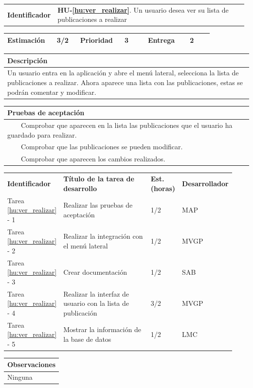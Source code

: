 \documentclass[11pt]{article}
\newcommand{\tabitem}{~~\llap{\textbullet}~~}
\begin{document}
\begin{longtable}{p{0.18\linewidth}|p{0.8\linewidth}}
  \rowcolor{LightCyan}
  \textbf{Identificador} & \textbf{HU-\ref{hu:ver_realizar}}. Un usuario desea ver su lista de publicaciones a realizar \\  
\end{longtable}
\vspace{-0.8cm}
\begin{longtable}{p{0.18\linewidth}|p{0.1\linewidth}|p{0.18\linewidth}|p{0.1\linewidth}|p{0.18\linewidth}|p{0.1\linewidth}}
  \toprule
  \textbf{Estimación} & 3/2 & \textbf{Prioridad} & 3 & \textbf{Entrega} & 2 \\
  \bottomrule
\end{longtable}
\vspace{-0.8cm}
\begin{longtable}{p{1.028\linewidth}}
  \textbf{Descripción}\\
  \midrule
  Un usuario entra en la aplicación y abre el menú lateral, selecciona la lista de publicaciones a realizar. Ahora aparece una lista con las publicaciones, estas se podrán comentar y modificar. \\
  \bottomrule
\end{longtable}
\vspace{-0.8cm}
\begin{longtable}{p{1.028\linewidth}}
  \textbf{Pruebas de aceptación}\\
  \midrule
  \tabitem Comprobar que aparecen en la lista las publicaciones que el usuario ha guardado para realizar. \\
  \tabitem Comprobar que las publicaciones se pueden modificar. \\
  \tabitem Comprobar que aparecen los cambios realizados.\\
\end{longtable}
\vspace{-0.8cm}
\begin{longtable}{p{0.18\linewidth}|p{0.48\linewidth}|p{0.1\linewidth}|p{0.17\linewidth}}
  \toprule
  \textbf{Identificador} & \textbf{Título de la tarea de desarrollo} & \textbf{Est. (horas)} & \textbf{Desarrollador} \\
  Tarea \ref{hu:ver_realizar} - 1 & Realizar las pruebas de aceptación & 1/2 & MAP\\
  Tarea \ref{hu:ver_realizar} - 2 & Realizar la integración con el menú lateral & 1/2 & MVGP\\
  Tarea \ref{hu:ver_realizar} - 3 & Crear documentación & 1/2 & SAB\\
  Tarea \ref{hu:ver_realizar} - 4 & Realizar la interfaz de usuario con la lista de publicación & 3/2 &  MVGP\\
  Tarea \ref{hu:ver_realizar} - 5 & Mostrar la información de la base de datos & 1/2 &  LMC\\
  \bottomrule
\end{longtable}
\vspace{-0.8cm}
\begin{longtable}{p{1.028\linewidth}}
  \textbf{Observaciones}\\
  \midrule
  Ninguna\\
  \bottomrule
\end{longtable}
\end{document}
